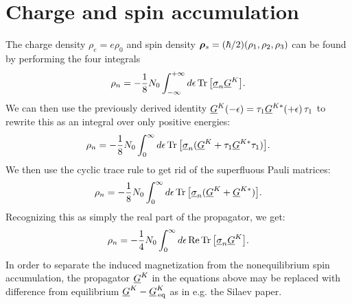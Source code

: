 \clearpage
\section{Charge and spin accumulation}
The charge density $\rho_e = e\rho_0$ and spin density $\bm{\rho}_s = (\hbar/2)(\rho_1, \rho_2, \rho_3)$ can be found by performing the four integrals
\begin{equation}
  \rho_n = -\frac{1}{8}N_0 \int_{-\infty}^{+\infty} d\epsilon \operatorname{Tr}\big[ \underline{\sigma}_{n} \underline{G}^K \big].
\end{equation}
We can then use the previously derived identity $\underline{G}^K(-\epsilon) = \tau_{1} \underline{G}^{K*}(+\epsilon) \,\tau_{1}$ to rewrite this as an integral over only positive energies:
\begin{equation}
  \rho_n = -\frac{1}{8}N_0 \int_{0}^{\infty} d\epsilon \operatorname{Tr}\big[ \underline{\sigma}_{n} (\underline{G}^K + \tau_{1} \underline{G}^{K*} \tau_{1})\big].
\end{equation}
We then use the cyclic trace rule to get rid of the superfluous Pauli matrices:
\begin{equation}
  \rho_n = -\frac{1}{8}N_0 \int_{0}^{\infty} d\epsilon \operatorname{Tr}\big[ \underline{\sigma}_{n} (\underline{G}^K + \underline{G}^{K*})\big].
\end{equation}
Recognizing this as simply the real part of the propagator, we get:
\begin{equation}
  \rho_n = -\frac{1}{4}N_0 \int_{0}^{\infty} d\epsilon \operatorname{Re}\operatorname{Tr}\big[ \underline{\sigma}_{n} \underline{G}^K \big].
\end{equation}
In order to separate the induced magnetization from the nonequilibrium spin accumulation, the propagator $\underline{G}^K$ in the equations above may be replaced with difference from equilibrium $\underline{G}^K-\underline{G}^K_\text{\,eq}$ as in e.g. the Silaev paper.

\clearpage
